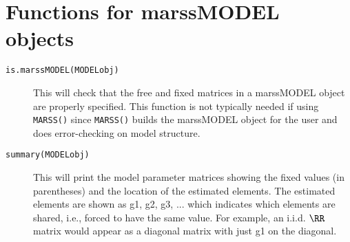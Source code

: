 
\section{Functions for marssMODEL objects}
\begin{description}	
		\item[\texttt{is.marssMODEL(MODELobj)}] This will check that the free and fixed matrices in a marssMODEL object are properly specified.  This function is not typically needed if using \texttt{MARSS()} since \texttt{MARSS()} builds the marssMODEL object for the user and does error-checking on model structure.
		\item[\texttt{summary(MODELobj)}] This will print the model parameter matrices showing the fixed values (in parentheses) and the location of the estimated elements.  The estimated elements are shown as g1, g2, g3, ... which indicates which elements are shared, i.e., forced to have the same value.  For example, an i.i.d. $\RR$ matrix would appear as a diagonal matrix with just g1 on the diagonal.
\end{description}
